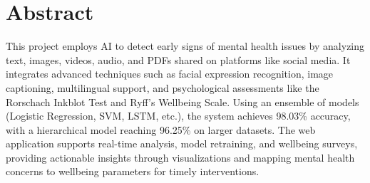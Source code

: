 

\section*{Abstract} 




\noindent
This project employs AI to detect early signs of mental health issues by analyzing text, images, videos, audio, and PDFs shared on platforms like social media. It integrates advanced techniques such as facial expression recognition, image captioning, multilingual support, and psychological assessments like the Rorschach Inkblot Test and Ryff's Wellbeing Scale. Using an ensemble of models (Logistic Regression, SVM, LSTM, etc.), the system achieves 98.03\% accuracy, with a hierarchical model reaching 96.25\% on larger datasets. The web application supports real-time analysis, model retraining, and wellbeing surveys, providing actionable insights through visualizations and mapping mental health concerns to wellbeing parameters for timely interventions.



\newpage
